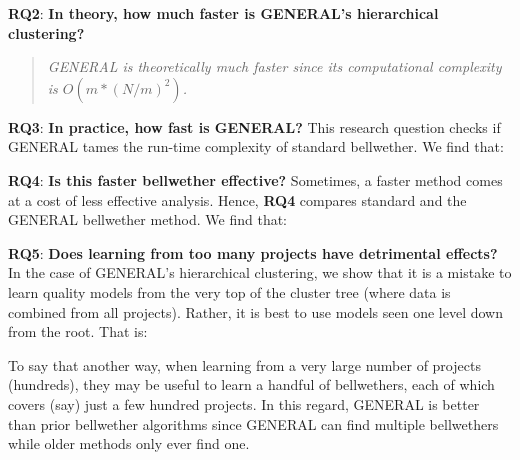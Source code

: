 \documentclass[10pt,journal,compsoc]{IEEEtran}
\begin{document}
            \noindent \textbf{RQ2}:  {\bf In theory, how much faster is GENERAL's hierarchical clustering?}        
            \begin{quote}
               {\em              GENERAL is theoretically much faster since
             its computational complexity is  $O(m*(N/m)^2)$.
            }\end{quote}
            \noindent \textbf{RQ3}:  {\bf  In practice,
            how fast is  GENERAL?} This research question checks if GENERAL tames the run-time complexity of standard bellwether. We find that:
            \begin{quote}
            \end{quote}
           \noindent \textbf{RQ4}: {\bf  Is this faster bellwether effective?}
            Sometimes,  a faster method   comes at a cost of less effective analysis. Hence, {\bf RQ4} compares
             standard and the GENERAL bellwether method. We  find that:
            \begin{quote}
            \end{quote}
       \noindent 
            \textbf{RQ5}: {\bf Does learning from too many projects have detrimental effects?}
          In the case of GENERAL's hierarchical clustering, we show that it is a mistake to  learn quality models from the very top of the cluster tree (where data is combined from all projects). Rather, it is best to use  models seen   one level down from the root. That is:
             \begin{quote}
              \end{quote} 
\noindent To say that another way,   when learning from a very large number of projects (hundreds), they may be useful
to learn a handful of bellwethers, each of which covers (say) just a few hundred projects. In this regard,
GENERAL is better than prior bellwether algorithms
since GENERAL can find multiple bellwethers while
older methods only ever find one.
    
\end{document}
